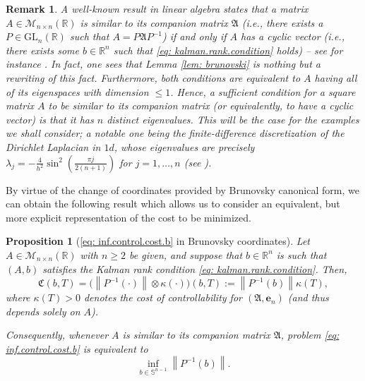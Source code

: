 \documentclass[journal,twoside,web]{ieeecolor}
\newcommand{\R}{\mathbb{R}}
\newtheorem{remark}{Remark}
\newtheorem{proposition}{Proposition}
\begin{document}
	\begin{remark} A well-known result in linear algebra states that a matrix $A\in \mathcal{M}_{n\times n}(\R)$ is similar to its companion matrix $\mathfrak{A}$ (i.e., there exists a $P\in\mathrm{GL}_n(\R)$ such that $A=P\mathfrak{A}P^{-1}$) if and only if $A$ has a cyclic vector (i.e., there exists some $b\in\R^n$ such that \eqref{eq: kalman.rank.condition} holds) -- see for instance \cite[Theorem 3.3.15]{horn2012matrix}. In fact, one sees that Lemma \ref{lem: brunovski} is nothing but a rewriting of this fact. Furthermore, both conditions are equivalent to $A$ having all of its eigenspaces with dimension $\leqslant1$. Hence, a sufficient condition for a square matrix $A$ to be similar to its companion matrix (or equivalently, to have a cyclic vector) is that it has $n$ distinct eigenvalues. This will be the case for the examples we shall consider; a notable one being the finite-difference discretization of the Dirichlet Laplacian in $1d$, whose eigenvalues are precisely $\lambda_j = -\frac{4}{h^2}\sin^2\left(\frac{\pi j}{2(n+1)}\right)$ for $j=1,\ldots,n$ (see \cite{vichnevetsky1982fourier}).
	\end{remark}
	\medskip
	
	\noindent
	By virtue of the change of coordinates provided by Brunovsky canonical form, we can obtain the following result which allows us to consider an equivalent, but more explicit representation of the cost to be minimized.
	\medskip
	
	\begin{proposition}[\eqref{eq: inf.control.cost.b} in Brunovsky coordinates] \label{prop: brunovsky.reform}
	Let $A\in \mathcal{M}_{n\times n}(\R)$ with $n\geqslant2$ be given, and suppose that $b\in\R^n$ is such that $(A,b)$ satisfies the Kalman rank condition \eqref{eq: kalman.rank.condition}.
	Then,
	\begin{equation*}
	\mathfrak{C}(b,T) = \Big(\left\|P^{-1}(\cdot)\right\| \otimes \kappa(\cdot)\Big)(b,T) := \left\|P^{-1}(b)\right\| \kappa(T),
	\end{equation*}
	where $\kappa(T)>0$ denotes the cost of controllability for $(\mathfrak{A}, \mathbf{e}_n)$ (and thus depends solely on $A$). 
	
	Consequently, whenever $A$ is similar to its companion matrix $\mathfrak{A}$, problem \eqref{eq: inf.control.cost.b} is equivalent to 
	\begin{equation} \label{eq: 18}
	\boxed{
	\inf_{b \in \mathbb{S}^{n-1}} \left\|P^{-1}(b)\right\|.
	}
	\end{equation}
	\end{proposition}
	\medskip
	
\end{document}
